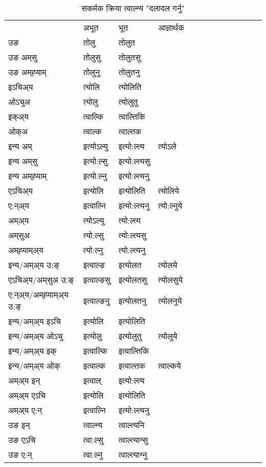 \begin{table}[H]
\centering
\caption{\label{ol.vt} सकर्मक क्रिया  त्वाल्न्य  "दलादल गर्नु"  }
\begin{tabular}{l|l|l|l|l|l|l|l|l|l|l|l|l}  \toprule
&अभूत & भूत & आज्ञार्थक \\ 
उङ &तोलु &तोलुत \\ 
उङ अम्‌सु &तोलुसु &तोलुतसु \\ 
उङ अम्‌ह्‍याम् &तोलुनु &तोलुतनु \\ 
इऽचिअ्य &त्योलि &त्योलिति   \\ 
ओऽचुअ &त्योलु &त्योलुतु   \\ 
इक्अ्य &त्वाल्कि &त्वाल्तिकि   \\ 
ओक्अ &त्वाल्क &त्वाल्तक   \\ 
इन्य अम् & इत्योऽल्यु  & इत्यो:ल्त्य &त्योऽले  \\ 
इन्य अम्‌सु & इत्यो:ल्सु  & इत्यो:ल्त्यसु   \\ 
इन्य अम्‌ह्‍याम् & इत्यो:ल्नु  & इत्यो:ल्त्यनु   \\ 
एऽचिअ्य & इत्योलि & इत्योलिति &त्योलिये    \\ 
ए:न्अ्य & इत्वाल्नि  & इत्यो:ल्त्यनु &त्यो:ल्नुये  \\ 
अम्अ्य & त्योऽल्यु  & त्यो:ल्त्य  \\ 
अम्‌सुअ & त्यो:ल्सु & त्यो:ल्त्यसु  \\ 
अम्‌ह्‍याम्अ्य & त्यो:ल्नु  & त्यो:ल्त्यनु \\ 
\midrule
इन्य/अम्अ्य उ:ङ्‌&इत्वाल्ङ & इत्योलत &त्योलये \\ 
एऽचिअ्य/अम्‌सुअ उ:ङ्‌ &इत्वाल्ङसु & इत्योलतसु &त्योलसुये \\ 
ए:न्अ्य/अम्‌ह्‍याम्अ्य उ:ङ्‌ &इत्वाल्ङनु & इत्योलतनु &त्योलनुये \\ 
इन्य/अम्अ्य इऽचि & इत्योलि & इत्योलिति    \\ 
इन्य/अम्अ्य ओऽचु & इत्योलु & इत्योलुतु  &त्योलुये  \\ 
इन्य/अम्अ्य इक् & इत्वाल्कि & इत्वाल्तिकि   \\ 
इन्य/अम्अ्य ओक् & इत्वाल्क & इत्वाल्तक  &त्वाल्कये  \\ 
अम्अ्य इन् & इत्वाल् & इत्यो:ल्त्य   \\ 
अम्अ्य एऽचि & इत्योलि & इत्योलिति    \\ 
अम्अ्य ए:न् & इत्वाल्नि  & इत्यो:ल्त्यनु  \\ 
\midrule
उङ इन् & त्वाल्न्य  & त्वाल्त्यनि  \\ 
उङ एऽचि & त्वा:ल्सु  & त्वाल्त्यान्सु   \\ 
उङ ए:न्& त्वा:ल्नु  & त्वाल्त्यान्‍नु   \\ 
\bottomrule
\end{tabular}
\end{table}


